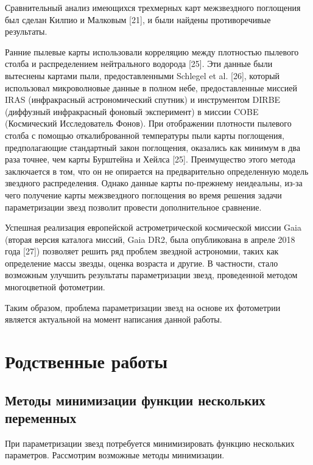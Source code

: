 \documentclass[12pt, a4paper]{article}
\begin{document}
	Сравнительный анализ имеющихся трехмерных карт межзвездного поглощения был сделан Килпио и Малковым [21], и были найдены противоречивые результаты.

	Ранние пылевые карты использовали корреляцию между плотностью пылевого столба и распределением нейтрального водорода [25]. Эти данные были вытеснены картами пыли, предоставленными Schlegel et al. [26], который использовал микроволновые данные в полном небе, предоставленные миссией IRAS (инфракрасный астрономический спутник) и инструментом DIRBE (диффузный инфракрасный фоновый эксперимент) в миссии COBE (Космический Исследователь Фонов). При отображении плотности пылевого столба с помощью откалиброванной температуры пыли карты поглощения, предполагающие стандартный закон поглощения, оказались как минимум в два раза точнее, чем карты Бурштейна и Хейлса [25]. Преимущество этого метода заключается в том, что он не опирается на предварительно определенную модель звездного распределения. Однако данные карты по-прежнему неидеальны, из-за чего получение карты межзвездного поглощения во время решения задачи параметризации звезд позволит провести дополнительное сравнение.

	Успешная реализация европейской астрометрической космической миссии Gaia (вторая версия каталога миссий, Gaia DR2, была опубликована в апреле 2018 года [27]) позволяет решить ряд проблем звездной астрономии, таких как определение массы звезды, оценка возраста и другие. В частности, стало возможным улучшить результаты параметризации звезд, проведенной методом многоцветной фотометрии.

	Таким образом, проблема параметризации звезд на основе их фотометрии является актуальной на момент написания данной работы.
	\section{Родственные работы}
	\subsection*{Методы минимизации функции нескольких переменных}
	При параметризации звезд потребуется минимизировать функцию нескольких параметров. Рассмотрим возможные методы минимизации.
\end{document}
